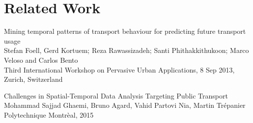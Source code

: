 \newpage
\section{Related Work}


Mining temporal patterns of transport behaviour for predicting future transport usage\\
Stefan Foell, Gerd Kortuem; Reza Rawassizadeh; Santi Phithakkithukoon; Marco Veloso and Carlos Bento\\
Third International Workshop on Pervasive Urban Applications, 8 Sep 2013, Zurich, Switzerland

Challenges in Spatial-Temporal Data Analysis Targeting Public Transport\\
Mohammad Sajjad Ghaemi, Bruno Agard, Vahid Partovi Nia, Martin Trépanier\\
Polytechnique Montrèal, 2015